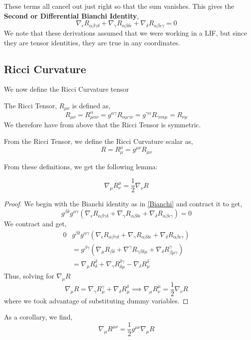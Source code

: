 \documentclass[11pt, a4paper]{article}
\begin{document}
These terms all cancel out just right so that the sum vanishes. This gives the \textbf{Second or Differential Bianchi Identity},
\begin{equation} \label{Bianchi}
\nabla_\epsilon R_{\alpha\beta\gamma\delta} + \nabla_\gamma R_{\alpha\beta\delta\epsilon} + \nabla_\delta R_{\alpha\beta\epsilon\gamma}  = 0
\end{equation}
We note that these derivations assumed that we were working in a LIF, but since they are tensor identities, they are true in any coordinates.

\subsection{Ricci Curvature}
We now define the Ricci Curvature tensor
\begin{definition}
The Ricci Tensor, $R_{\mu\nu}$ is defined as, 
\[R_{\mu\nu} = R^\alpha _{\mu\alpha\nu} = g^{\alpha\gamma} R_{\alpha\mu\gamma\nu} = g^{\gamma\alpha} R_{\gamma\nu\alpha\mu} = R_{\nu \mu}\]
We therefore have from above that the Ricci Tensor is symmetric.
\end{definition}
\begin{definition}
From the Ricci Tensor, we define the Ricci Curvature scalar as, 
\[R = R^\mu_\mu = g^{\mu\nu} R_{\mu\nu}\]
\end{definition}
From these definitions, we get the following lemma:
\begin{lemma}
\[\nabla_\mu R^\mu_\nu  = \frac{1}{2}\nabla_\nu R\]
\begin{proof}
We begin with the Bianchi identity as in \ref{Bianchi} and contract it to get, 
\[g^{\beta\delta} g^{\alpha\gamma}\left(\nabla_\epsilon R_{\alpha\beta\gamma\delta} + \nabla_\gamma R_{\alpha\beta\delta\epsilon} + \nabla_\delta R_{\alpha\beta\epsilon\gamma} \right) = 0\]
We contract and get, 
\begin{align*}
    0 &g^{\beta\delta} g^{\alpha\gamma}\left(\nabla_\epsilon R_{\alpha\beta\gamma\delta} + \nabla_\gamma R_{\alpha\beta\delta\epsilon} + \nabla_\delta R_{\alpha\beta\epsilon\gamma} \right) 
    \\
    & = g^{\beta\gamma}\left(\nabla_\mu R_{\beta\delta} + \nabla^\gamma R_{\gamma\beta\delta\mu} + \nabla_{\delta} R^\gamma_{\beta\mu\gamma}\right)
    \\
    & = \nabla_\mu R^\delta_\delta + \nabla_\gamma R^{\delta\gamma}_{\delta\mu} - \nabla_\delta R^\delta_\mu
\end{align*}
Thus, solving for $\nabla_\mu R$
\[\nabla_\mu R = \nabla_\gamma R^\gamma_\mu + \nabla_\delta R^\delta_\mu\implies \nabla_\mu R^\mu_\nu = \frac{1}{2}\nabla_\nu R\]
where we took advantage of substituting dummy variables.
\end{proof}
\end{lemma}
\noindent
As a corollary, we find, 
\[\nabla_\mu R^{\mu\nu} = \frac{1}{2}g^{\mu\nu}\nabla_\mu R\]
\end{document}
